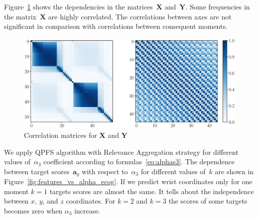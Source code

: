 \documentclass[12pt,twoside]{article}
\newcommand{\ba}{\mathbf{a}}
\newcommand{\bY}{\mathbf{Y}}
\newcommand{\bX}{\mathbf{X}}
\begin{document}
Figure~\ref{fig:corr_matrix} shows the dependencies in the matrices~$\bX$ and~$\bY$. Some frequencies in the matrix~$\bX$ are highly correlated.
The correlations between axes are not significant in comparison with correlations between consequent moments.
\begin{figure}
	\includegraphics[width=\linewidth]{figs/corr_matrix.eps}
	\caption{Correlation matrices for $\bX$ and $\bY$}
	\label{fig:corr_matrix}
\end{figure}

We apply QPFS algorithm with Relevance Aggregation strategy for different values of~$\alpha_3$ coefficient according to formulas~\eqref{eq:alphas3}.
The dependence between target scores~$\ba_y$ with respect to~$\alpha_3$ for different values of~$k$ are shown in Figure~\ref{fig:features_vs_alpha_ecog}.
If we predict wrist coordinates only for one moment $k = 1$ targets scores are almost the same.
It tells about the independence between $x$, $y$, and $z$ coordinates.
For $k = 2$ and $k = 3$ the scores of some targets becomes zero when $\alpha_3$ increase.
\end{document}
